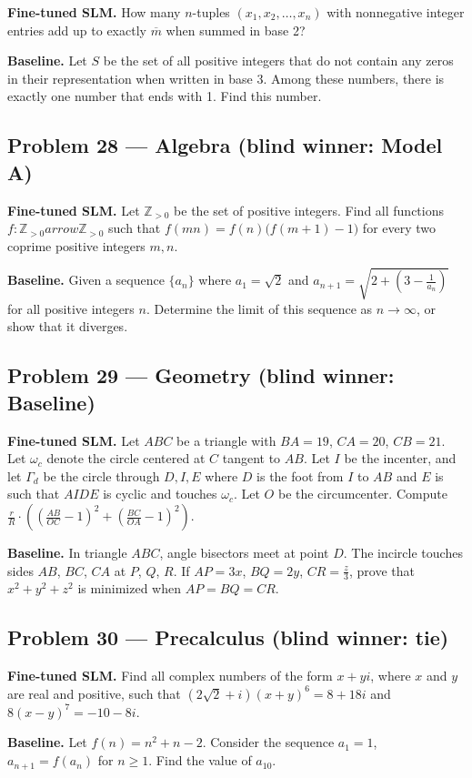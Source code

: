 \documentclass[11pt]{article}
\begin{document}
\textbf{Fine-tuned SLM.} How many $n$-tuples $(x_1,x_2,\ldots,x_n)$ with nonnegative integer entries add up to exactly $\overline{m}$ when summed in base 2?

\medskip

\textbf{Baseline.} Let $S$ be the set of all positive integers that do not contain any zeros in their representation when written in base 3. Among these numbers, there is exactly one number that ends with 1. Find this number.

\subsection*{Problem 28 --- Algebra \quad (blind winner: Model A)}

\textbf{Fine-tuned SLM.} Let $\mathbb{Z}_{>0}$ be the set of positive integers. Find all functions $f : \mathbb{Z}_{>0} arrow \mathbb{Z}_{>0}$ such that $f(mn) = f(n)\big(f(m+1)-1\big)$ for every two coprime positive integers $m,n$.

\medskip

\textbf{Baseline.} Given a sequence $\{a_n\}$ where $a_1 = \sqrt{2}$ and $a_{n+1} = \sqrt{2 + (3 - \frac{1}{a_n})}$ for all positive integers $n$. Determine the limit of this sequence as $n \to \infty$, or show that it diverges.

\subsection*{Problem 29 --- Geometry \quad (blind winner: Baseline)}

\textbf{Fine-tuned SLM.} Let $ABC$ be a triangle with $BA=19$, $CA=20$, $CB=21$. Let $\omega_{c}$ denote the circle centered at $C$ tangent to $AB$. Let $I$ be the incenter, and let $\Gamma_{d}$ be the circle through $D,I,E$ where $D$ is the foot from $I$ to $AB$ and $E$ is such that $AIDE$ is cyclic and touches $\omega_{c}$. Let $O$ be the circumcenter. Compute $\frac{r}{R}\cdot( (\frac{AB}{OC}-1)^{2}+(\frac{BC}{OA}-1)^{2})$.

\medskip

\textbf{Baseline.} In triangle $ABC$, angle bisectors meet at point $D$. The incircle touches sides $AB$, $BC$, $CA$ at $P$, $Q$, $R$. If $AP = 3x$, $BQ = 2y$, $CR = \frac{z}{3}$, prove that $x^2 + y^2 + z^2$ is minimized when $AP = BQ = CR$.

\subsection*{Problem 30 --- Precalculus \quad (blind winner: tie)}

\textbf{Fine-tuned SLM.} Find all complex numbers of the form $x + yi$, where $x$ and $y$ are real and positive, such that $(2\sqrt{2}+i)(x+y)^6 = 8 + 18i$ and $8(x-y)^7 = -10 - 8i$.

\medskip

\textbf{Baseline.} Let $f(n) = n^2 + n - 2$. Consider the sequence $a_1 = 1$, $a_{n+1} = f(a_n)$ for $n \geq 1$. Find the value of $a_{10}$.
\end{document}
